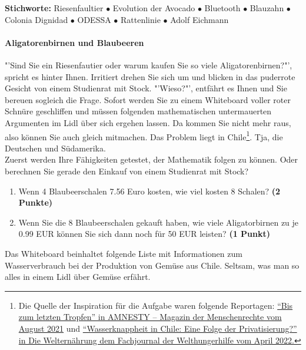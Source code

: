 \documentclass[a4paper, 9pt]{scrartcl}\usepackage[]{graphicx}\usepackage[]{xcolor}
\begin{document}
{\tiny\textbf{Stichworte:} Riesenfaultier $\bullet$ Evolution der Avocado $\bullet$ Bluetooth $ \bullet$ Blauzahn $\bullet$ Colonia Dignidad $\bullet$ ODESSA $\bullet$ Rattenlinie $\bullet$ Adolf Eichmann}


\paragraph{Aligatorenbirnen und Blaubeeren}



"'Sind Sie ein Riesenfautier oder warum kaufen Sie so viele
Aligatorenbirnen?"', spricht es hinter Ihnen. Irritiert drehen Sie sich um
und blicken in das puderrote Gesicht von einem Studienrat mit Stock. "'Wieso?"', entfährt es
Ihnen und Sie bereuen sogleich die Frage. Sofort werden Sie zu einem
Whiteboard voller roter Schnüre geschliffen und müssen folgenden
mathematischen untermauerten Argumenten im Lidl über sich ergehen
lassen. Da kommen Sie nicht mehr raus, also können Sie auch gleich
mitmachen. Das Problem liegt in Chile\footnote{Die Quelle der Inspiration
  für die Aufgabe waren folgende Reportagen:
  \href{https://www.amnesty.ch/de/ueber-amnesty/publikationen/magazin-amnesty/2021-3/bis-zum-letzten-tropfen}{"`Bis
  zum letzten Tropfen"' in AMNESTY – Magazin der Menschenrechte vom August
  2021} und
\href{https://www.welthungerhilfe.de/welternaehrung/rubriken/klima-ressourcen/wassernot-in-chile-eine-folge-der-privatisierung}{"`Wasserknappheit
  in Chile: Eine Folge der Privatisierung?"' in Die Welternährung dem
  Fachjournal der Welthungerhilfe vom April 2022.}}. Tja, die Deutschen und Südamerika.\\

Zuerst werden Ihre Fähigkeiten getestet, der Mathematik folgen zu können. Oder berechnen Sie gerade den Einkauf von einem Studienrat mit Stock?\\

\begin{enumerate}
\item Wenn 4 Blaubeerschalen 7.56 Euro kosten,  wie viel kosten 8 Schalen? \textbf{(2 Punkte)}
\item Wenn Sie die 8 Blaubeerschalen gekauft haben, wie viele Aligatorbirnen zu je 0.99 EUR können Sie sich dann noch für 50 EUR leisten? \textbf{(1 Punkt)}
\end{enumerate}

Das Whiteboard beinhaltet folgende Liste mit Informationen zum Wasserverbrauch bei der Produktion von Gemüse aus Chile. Seltsam, was man so alles in einem Lidl über Gemüse erfährt.
  
\end{document}
